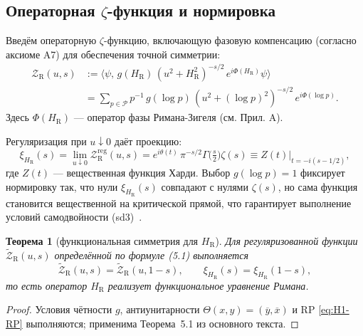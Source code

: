 \documentclass{article}
\numberwithin{equation}{section}
\theoremstyle{plain}
\newtheorem{theorem}{Теорема}
\theoremstyle{definition}
\theoremstyle{remark}
\def\theta{θ}\def\Theta{Θ}\def\pi{π}\def\Pi{Π}%
\begin{document}
\subsection*{Операторная $\zeta$-функция и нормировка}

Введём операторную $\zeta$-функцию, включающую фазовую компенсацию (согласно аксиоме A7) для обеспечения точной симметрии:
\begin{equation}\label{eq:H1-Z}
\begin{aligned}
\mathcal Z_{\mathrm R}(u,s)
&:=\langle\psi,\,g(H_{\mathrm R})\,(u^2+H_{\mathrm R}^2)^{-s/2}\,e^{i\Phi(H_{\mathrm R})}\psi\rangle \\
&=\sum_{p\in\mathcal{P}} p^{-1}\,g(\log p)\,(u^2+(\log p)^2)^{-s/2}\,e^{i\Phi(\log p)}.
\end{aligned}
\end{equation}
Здесь $\Phi(H_{\mathrm R})$ — оператор фазы Римана-Зигеля (см. Прил. A). 

Регуляризация при $u\downarrow0$ даёт проекцию:
\begin{equation}\label{eq:H1-xi}
\xi_{H_{\mathrm R}}(s)
=\lim_{u\downarrow0}\mathcal Z^{\mathrm{reg}}_{\mathrm R}(u,s)
=e^{i\theta(t)}\,\pi^{-s/2}\Gamma\!\Big(\tfrac s2\Big)\zeta(s) \equiv Z(t) \big|_{t=-i(s-1/2)},
\end{equation}
где $Z(t)$ — вещественная функция Харди. Выбор $g(\log p)=1$ фиксирует нормировку так, что нули $\xi_{H_{\mathrm R}}(s)$ совпадают с нулями $\zeta(s)$, но сама функция становится вещественной на критической прямой, что гарантирует выполнение условий самодвойности (sd3)~\cite{Titchmarsh1986, Edwards1974}.

\begin{theorem}[функциональная симметрия для \(H_{\mathrm R}\)]
Для регуляризованной функции \(\widetilde{\mathcal Z}_{\mathrm R}(u,s)\)
определённой по формуле (5.1) выполняется
\begin{equation}\label{eq:H1-FE}
\widetilde{\mathcal Z}_{\mathrm R}(u,s)
=\widetilde{\mathcal Z}_{\mathrm R}(u,1-s),\qquad
\xi_{H_{\mathrm R}}(s)=\xi_{H_{\mathrm R}}(1-s),
\end{equation}
то есть оператор \(H_{\mathrm R}\) реализует функциональное уравнение Римана.
\end{theorem}

\begin{proof}
Условия чётности \(g\), антиунитарности \(\Theta(x,y)=(\overline{y},\overline{x})\)
и RP \eqref{eq:H1-RP} выполняются; применима Теорема~5.1 из основного текста.
\end{proof}
\end{document}
